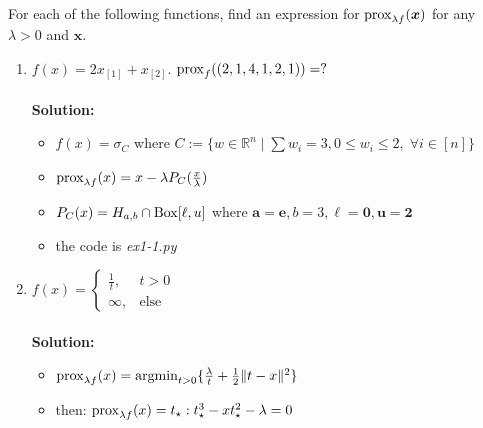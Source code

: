 
For each of the following functions, find an expression for $\operatorname{prox}_{\lambda f}(\bm x)$ for any $\lambda > 0$ and $\bm x$.
\begin{enumerate}
    \item $f(x)=2x_{[1]}+x_{[2]}$. $\operatorname{prox}_f((2,1,4,1,2,1))=?$ \\\\
    \textbf{Solution:}
        \begin{itemize}
        \item $f(x)=\sigma_{C}$ where $C := \{w \in \mathbb{R}^n \mid \sum{w_i} = 3, 0 \leq w_i \leq 2, \; \forall i \in [n]\}$
        \item $\operatorname{prox}_{\lambda f}(x) = x - \lambda P_C(\frac{x}{\lambda})$
        \item $P_C(x)=H_{a,b} \cap \operatorname{Box}[\ell,u]$ where $\bm a=\bm e, b = 3, \bm\ell = \bm 0, \bm u = \bm 2$
        \item the code is \emph{ex1-1.py}
        \end{itemize}
    
    \item $f(x)=
    \begin{cases}
        \frac{1}{t}, & t > 0\\
        \infty, & \text{else}
    \end{cases}$\\\\
    \textbf{Solution:}
    \begin{itemize}
        \item $\operatorname{prox}_{\lambda f}(x) = \operatorname*{arg min}_{t>0} \{\frac{\lambda}{t} + \frac{1}{2} \|t-x\|^2\}$
        \item then: $\operatorname{prox}_{\lambda f}(x)=t_\star : t_\star^3 - x t_\star^2 - \lambda = 0$
    \end{itemize}


\end{enumerate}
